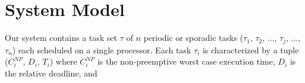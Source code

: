 \section{System Model}\label{sec:system_model}

Our system contains a task set \begin{math}\tau\end{math} of $n$ periodic or sporadic tasks (\begin{math}\tau_{1}\end{math}, \begin{math}\tau_{2}\end{math}, ..., \begin{math}\tau_{j}\end{math}, ..., \begin{math}\tau_{n}\end{math}) each scheduled on a single processor.  Each task \begin{math}\tau_{i}\end{math} is characterized by a tuple (\begin{math}C_{i}^{NP}\end{math}, \begin{math}D_{i}\end{math}, \begin{math}T_{i}\end{math}) where
\begin{math}C_{i}^{NP}\end{math} is the non-preemptive worst case execution time, \begin{math}D_{i}\end{math} is the relative deadline, and 
